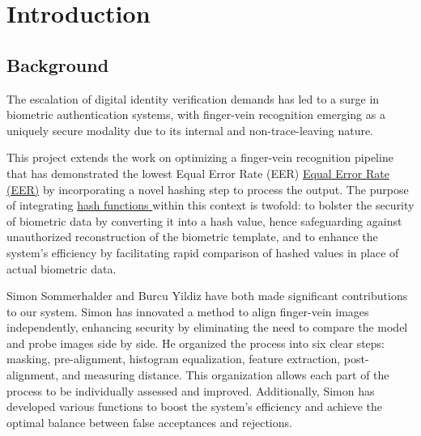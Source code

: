 \section{Introduction}

\subsection{Background}

The escalation of digital identity verification demands has led to a surge in biometric authentication systems, with finger-vein recognition emerging as a uniquely secure modality due to its internal and non-trace-leaving nature.

This project extends the work on optimizing a finger-vein recognition pipeline that has demonstrated the lowest Equal Error Rate (EER) \hyperref[def:EER]{Equal Error Rate (EER)} by incorporating a novel hashing step to process the output. The purpose of integrating \hyperref[def:Hash_Function]{hash functions } within this context is twofold: to bolster the security of biometric data by converting it into a hash value, hence safeguarding against unauthorized reconstruction of the biometric template, and to enhance the system's efficiency by facilitating rapid comparison of hashed values in place of actual biometric data.


Simon Sommerhalder and Burcu Yildiz have both made significant contributions to our system. Simon has innovated a method to align finger-vein images independently, enhancing security by eliminating the need to compare the model and probe images side by side. He organized the process into six clear steps: masking, pre-alignment, histogram equalization, feature extraction, post-alignment, and measuring distance. This organization allows each part of the process to be individually assessed and improved. Additionally, Simon has developed various functions to boost the system's efficiency and achieve the optimal balance between false acceptances and rejections. 


